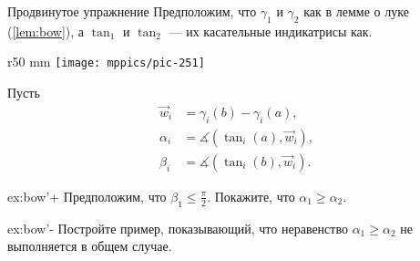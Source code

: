 \begin{thm}{Продвинутое упражнение}\label{ex:bow'}
Предположим, что $\gamma_1$ и $\gamma_2$ как в лемме о луке (\ref{lem:bow}),
а  $\tan_1$ и $\tan_2$ --- их касательные индикатрисы как.

{

\begin{wrapfigure}{r}{50 mm}
\vskip-0mm
\centering
\texttt{[image: mppics/pic-251]}
\vskip-4mm
\end{wrapfigure}

Пусть 
\begin{align*}
\vec w_i&=\gamma_i(b)-\gamma_i(a),
\\
\alpha_i&=\measuredangle(\tan_i(a),\vec w_i),
\\
\beta_i&=\measuredangle(\tan_i(b),\vec w_i).
\end{align*}

}

\begin{subthm}{ex:bow'+}
Предположим, что $\beta_1\le\tfrac\pi2$.
Покажите, что $\alpha_1\ge \alpha_2$.
\end{subthm}

\begin{subthm}{ex:bow'-}
Постройте пример, показывающий, что неравенство $\alpha_1\ge \alpha_2$ не выполняется в общем случае.
\end{subthm}

\end{thm}

\pagebreak

